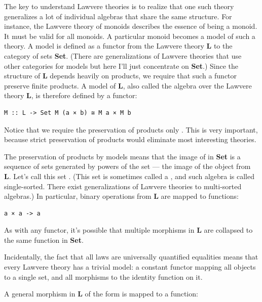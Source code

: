 The key to understand Lawvere theories is to realize that one such
theory generalizes a lot of individual algebras that share the same
structure. For instance, the Lawvere theory of monoids describes the
essence of being a monoid. It must be valid for all monoids. A
particular monoid becomes a model of such a theory. A model is defined
as a functor from the Lawvere theory \textbf{L} to the category of sets
\textbf{Set}. (There are generalizations of Lawvere theories that use
other categories for models but here I'll just concentrate on
\textbf{Set}.) Since the structure of \textbf{L} depends heavily on
products, we require that such a functor preserve finite products. A
model of \textbf{L}, also called the algebra over the Lawvere theory
\textbf{L}, is therefore defined by a functor:

\begin{Verbatim}[commandchars=\\\{\}]
M :: L -> Set M (a × b) ≅ M a × M b
\end{Verbatim}

Notice that we require the preservation of products only . This is very important, because strict preservation of
products would eliminate most interesting theories.

The preservation of products by models means that the image of
 in \textbf{Set} is a sequence of sets generated by powers of
the set  --- the image of the object  from
\textbf{L}. Let's call this set . (This set is sometimes
called a , and such algebra is called single-sorted. There
exist generalizations of Lawvere theories to multi-sorted algebras.) In
particular, binary operations from \textbf{L} are mapped to functions:

\begin{Verbatim}[commandchars=\\\{\}]
a × a -> a
\end{Verbatim}

As with any functor, it's possible that multiple morphisms in \textbf{L}
are collapsed to the same function in \textbf{Set}.

Incidentally, the fact that all laws are universally quantified
equalities means that every Lawvere theory has a trivial model: a
constant functor mapping all objects to a single set, and all morphisms
to the identity function on it.

A general morphism in \textbf{L} of the form
 is mapped to a function:

